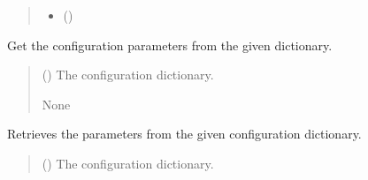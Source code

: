 \documentclass[a4paper,11pt,english,openany]{sphinxmanual}
\begin{document}
\begin{fulllineitems}
\begin{fulllineitems}
\begin{fulllineitems}
\begin{quote}
\begin{description}
\begin{itemize}
\item {} 
\sphinxAtStartPar
{} ()

\end{itemize}

\sphinxAtStartPar
{}

\end{description}\end{quote}

\end{fulllineitems}


\end{fulllineitems}


\begin{fulllineitems}
\label{\detokenize{api/spyice.utils.config_sort:spyice.utils.config_sort.ConfigSort.get_config_params}}
\pysigstartsignatures
{}
\pysigstopsignatures
\sphinxAtStartPar
Get the configuration parameters from the given  dictionary.
\begin{quote}\begin{description}
\sphinxAtStartPar
{} () \textendash{} The configuration dictionary.

\sphinxAtStartPar
None

\sphinxAtStartPar
{} \textendash{} 

\end{description}\end{quote}

\end{fulllineitems}


\begin{fulllineitems}
\label{\detokenize{api/spyice.utils.config_sort:id2}}
\pysigstartsignatures
{}
\pysigstopsignatures
\sphinxAtStartPar
Retrieves the parameters from the given configuration dictionary.
\begin{quote}\begin{description}
\sphinxAtStartPar
{} () \textendash{} The configuration dictionary.


\end{description}
\end{quote}
\end{fulllineitems}
\end{fulllineitems}
\end{document}
